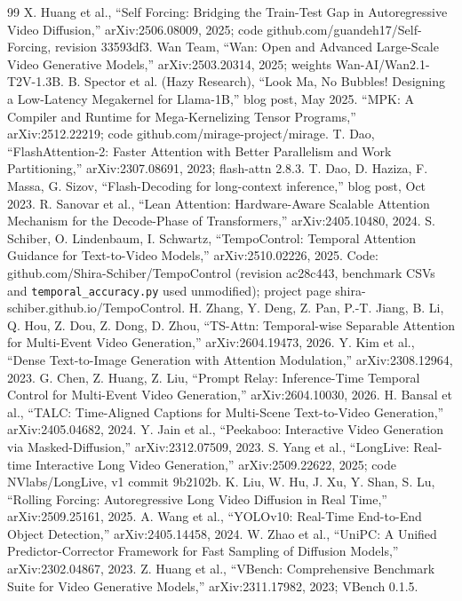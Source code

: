 \documentclass[10pt,a4paper]{article}
\begin{document}
\begin{thebibliography}{99}\small
{} X. Huang et al., ``Self Forcing: Bridging the Train-Test Gap in Autoregressive Video Diffusion,'' arXiv:2506.08009, 2025; code github.com/guandeh17/Self-Forcing, revision 33593df3.
 Wan Team, ``Wan: Open and Advanced Large-Scale Video Generative Models,'' arXiv:2503.20314, 2025; weights Wan-AI/Wan2.1-T2V-1.3B.
 B. Spector et al. (Hazy Research), ``Look Ma, No Bubbles! Designing a Low-Latency Megakernel for Llama-1B,'' blog post, May 2025.
 ``MPK: A Compiler and Runtime for Mega-Kernelizing Tensor Programs,'' arXiv:2512.22219; code github.com/mirage-project/mirage.
 T. Dao, ``FlashAttention-2: Faster Attention with Better Parallelism and Work Partitioning,'' arXiv:2307.08691, 2023; flash-attn 2.8.3.
 T. Dao, D. Haziza, F. Massa, G. Sizov, ``Flash-Decoding for long-context inference,'' blog post, Oct 2023.
 R. Sanovar et al., ``Lean Attention: Hardware-Aware Scalable Attention Mechanism for the Decode-Phase of Transformers,'' arXiv:2405.10480, 2024.
 S. Schiber, O. Lindenbaum, I. Schwartz, ``TempoControl: Temporal Attention Guidance for Text-to-Video Models,'' arXiv:2510.02226, 2025. Code: github.com/Shira-Schiber/TempoControl (revision ac28c443, benchmark CSVs and \texttt{temporal\_accuracy.py} used unmodified); project page shira-schiber.github.io/TempoControl.
 H. Zhang, Y. Deng, Z. Pan, P.-T. Jiang, B. Li, Q. Hou, Z. Dou, Z. Dong, D. Zhou, ``TS-Attn: Temporal-wise Separable Attention for Multi-Event Video Generation,'' arXiv:2604.19473, 2026.
 Y. Kim et al., ``Dense Text-to-Image Generation with Attention Modulation,'' arXiv:2308.12964, 2023.
 G. Chen, Z. Huang, Z. Liu, ``Prompt Relay: Inference-Time Temporal Control for Multi-Event Video Generation,'' arXiv:2604.10030, 2026.
 H. Bansal et al., ``TALC: Time-Aligned Captions for Multi-Scene Text-to-Video Generation,'' arXiv:2405.04682, 2024.
 Y. Jain et al., ``Peekaboo: Interactive Video Generation via Masked-Diffusion,'' arXiv:2312.07509, 2023.
 S. Yang et al., ``LongLive: Real-time Interactive Long Video Generation,'' arXiv:2509.22622, 2025; code NVlabs/LongLive, v1 commit 9b2102b.
 K. Liu, W. Hu, J. Xu, Y. Shan, S. Lu, ``Rolling Forcing: Autoregressive Long Video Diffusion in Real Time,'' arXiv:2509.25161, 2025.
 A. Wang et al., ``YOLOv10: Real-Time End-to-End Object Detection,'' arXiv:2405.14458, 2024.
 W. Zhao et al., ``UniPC: A Unified Predictor-Corrector Framework for Fast Sampling of Diffusion Models,'' arXiv:2302.04867, 2023.
 Z. Huang et al., ``VBench: Comprehensive Benchmark Suite for Video Generative Models,'' arXiv:2311.17982, 2023; VBench 0.1.5.
\end{thebibliography}
\end{document}
